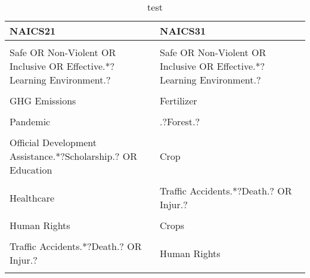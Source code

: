 \begin{table}[!h]

\caption{\label{tab:}test}
\centering
\begin{tabular}[t]{ll}
\toprule
NAICS21 & NAICS31\\
\midrule
\cellcolor{gray!6}{Governance} & \cellcolor{gray!6}{COVID-19}\\
Safe OR Non-Violent OR Inclusive OR Effective.*?Learning Environment.? & Safe OR Non-Violent OR Inclusive OR Effective.*?Learning Environment.?\\
\cellcolor{gray!6}{COVID-19} & \cellcolor{gray!6}{Governance}\\
GHG Emissions & Fertilizer\\
\cellcolor{gray!6}{Climate Change} & \cellcolor{gray!6}{Pandemic}\\
\addlinespace
Pandemic & .?Forest.?\\
\cellcolor{gray!6}{Transportation} & \cellcolor{gray!6}{Waste}\\
Official Development Assistance.*?Scholarship.? OR Education & Crop\\
\cellcolor{gray!6}{Waste} & \cellcolor{gray!6}{Traffic Accident.*?Death.? OR Injur.?}\\
Healthcare & Traffic Accidents.*?Death.? OR Injur.?\\
\addlinespace
\cellcolor{gray!6}{Greenhouse Gas} & \cellcolor{gray!6}{Transportation}\\
Human Rights & Crops\\
\cellcolor{gray!6}{Traffic Accident.*?Death.? OR Injur.?} & \cellcolor{gray!6}{Ecosystem.?}\\
Traffic Accidents.*?Death.? OR Injur.? & Human Rights\\
\cellcolor{gray!6}{Cultural Heritage} & \cellcolor{gray!6}{Healthcare}\\
\bottomrule
\end{tabular}
\end{table}
